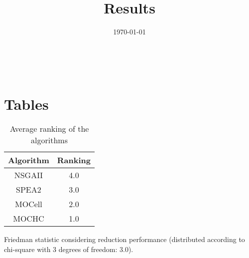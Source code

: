 \documentclass{article}
\title{Results}
\author{}
\date{\today}
\begin{document}
\oddsidemargin 0in \topmargin 0in\maketitle
\
\section{Tables}
\begin{table}[!htp]
\centering
\caption{Average ranking of the algorithms}
\begin{tabular}{c|c}
Algorithm&Ranking\\
\hline
NSGAII&4.0\\
SPEA2&3.0\\
MOCell&2.0\\
MOCHC&1.0\\
\end{tabular}
\end{table}


Friedman statistic considering reduction performance (distributed according to chi-square with 3 degrees of freedom: 3.0).
\end{document}

